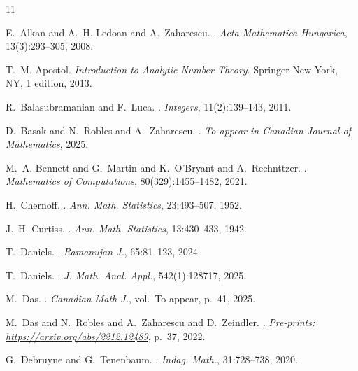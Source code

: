 \documentclass[12pt, oneside,reqno]{amsart}
\numberwithin{equation}{section}
\begin{document}
\begin{thebibliography}{11}

E.~Alkan and A.~H. Ledoan and A.~Zaharescu.
.
\newblock \textit{Acta Mathematica Hungarica}, 13(3):293--305, 2008.

T.~M. Apostol.
\newblock \textit{Introduction to Analytic Number Theory}.
\newblock Springer New York, NY, 1 edition, 2013.

R.~Balasubramanian and F.~Luca.
.
\newblock \textit{Integers}, 11(2):139--143, 2011.

D.~Basak and N.~Robles and A.~Zaharescu.
.
\newblock \textit{To appear in Canadian Journal of Mathematics}, 2025.

M.~A. Bennett and G.~Martin and K.~O'Bryant and A.~Rechnttzer.
.
\newblock \textit{Mathematics of Computations}, 80(329):1455--1482, 2021.


H.~Chernoff.
.
\newblock \textit{Ann. Math. Statistics}, 23:493--507, 1952.

J.~H. Curtiss.
.
\newblock \textit{Ann. Math. Statistics}, 13:430--433, 1942.

T.~Daniels.
.
\newblock \textit{Ramanujan J.}, 65:81--123, 2024.

T.~Daniels.
.
\newblock \textit{J. Math. Anal. Appl.}, 542(1):128717, 2025.

M.~Das.
.
\newblock \textit{Canadian Math J.}, vol.~To appear, p.~41, 2025.

M.~Das and N.~Robles and A.~Zaharescu and D.~Zeindler.
.
\newblock \textit{Pre-prints: \url{https://arxiv.org/abs/2212.12489}}, p.~37,
  2022.

G.~Debruyne and G.~Tenenbaum.
.
\newblock \textit{Indag. Math.}, 31:728--738, 2020.


\end{thebibliography}
\end{document}
